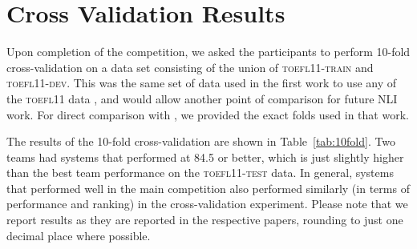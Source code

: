 \documentclass[11pt,letterpaper]{article}
\begin{document}











\section{Cross Validation Results}
\label{sec-cross-validation}
Upon completion of the competition, we asked the participants to
perform 10-fold cross-validation on a data set consisting of the union
of \textsc{toefl11-train} and \textsc{toefl11-dev}.  This was the same set of data
used in the first work to use any of the \textsc{toefl11} data
\cite{tetreault-EtAl:2012:PAPERS}, and would allow another point of
comparison for future NLI work.  For direct comparison with
, we provided the exact folds used in
that work.

The results of the 10-fold cross-validation are shown in Table~\ref{tab:10fold}.
Two teams had systems that performed at 84.5 or better, which is just
slightly higher than the best team performance on the \textsc{toefl11-test} data.  In
general, systems that performed well in the main competition also
performed similarly (in terms of performance and ranking) in the
cross-validation experiment.  Please note that we report results as they
are reported in the respective papers, rounding to just one decimal place
where possible.
\end{document}
